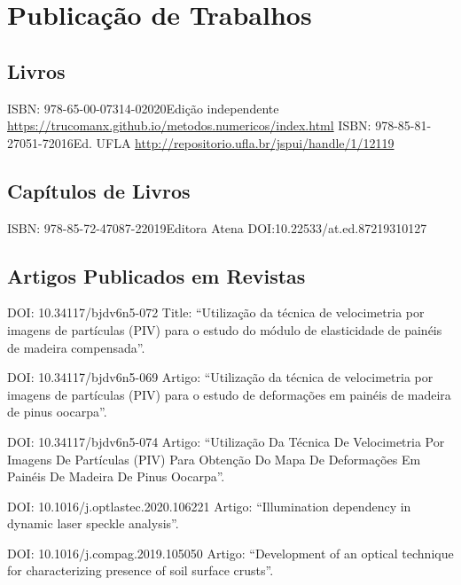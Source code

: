 \documentclass[11pt,a4paper,sans]{moderncv} %
\begin{document}
\section{Publicação de Trabalhos}
\subsection{Livros}
	      {ISBN: 978-65-00-07314-0}{2020}{Edição independente}
	      {\url{https://trucomanx.github.io/metodos.numericos/index.html}}
	      {ISBN: 978-85-81-27051-7}{2016}{Ed. UFLA}
	      {\url{http://repositorio.ufla.br/jspui/handle/1/12119}}

\subsection{Capítulos de Livros}
	      {ISBN: 978-85-72-47087-2}{2019}{Editora Atena}
	      {DOI:10.22533/at.ed.87219310127}

\subsection{Artigos Publicados em Revistas}

	      {DOI: 10.34117/bjdv6n5-072}{}{}
	      {Title: ``Utilização da técnica de velocimetria por imagens de partículas (PIV) para o estudo do módulo de elasticidade de painéis de madeira compensada''.}

	      {DOI: 10.34117/bjdv6n5-069}{}{}
	      {Artigo: ``Utilização da técnica de velocimetria por imagens de partículas (PIV) para o estudo de deformações em painéis de madeira de pinus oocarpa''.}


	      {DOI: 10.34117/bjdv6n5-074}{}{}
	      {Artigo: ``Utilização Da Técnica De Velocimetria Por Imagens De Partículas (PIV) Para Obtenção Do Mapa De Deformações Em Painéis De Madeira De Pinus Oocarpa''.}

	      {DOI: 10.1016/j.optlastec.2020.106221}{}{}
	      {Artigo: ``Illumination dependency in dynamic laser speckle analysis''.}


	      {DOI: 10.1016/j.compag.2019.105050}{}{}
	      {Artigo: ``Development of an optical technique for characterizing presence of soil surface crusts''.}
\end{document}
